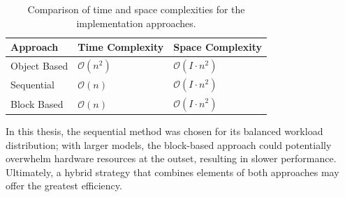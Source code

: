 \begin{table}[h!]
\centering
\caption{Comparison of time and space complexities for the implementation approaches.}
\begin{tabular}{|l|l|l|}
\hline
\textbf{Approach}    & \textbf{Time Complexity} & \textbf{Space Complexity} \\
\hline
Object Based          & $\mathcal{O}(n^2)$        & $\mathcal{O}(I \cdot n^2)$        \\
Sequential          & $\mathcal{O}(n)$        & $\mathcal{O}(I \cdot n^2)$       \\
Block Based              & $\mathcal{O}(n)$        & $\mathcal{O}(I \cdot n^2)$        \\
\hline
\end{tabular}
\label{tab:approachescomplexityComparison}
\end{table}

In this thesis, the sequential method was chosen for its balanced workload distribution; with larger models, the block-based approach could potentially overwhelm hardware resources at the outset, resulting in slower performance. Ultimately, a hybrid strategy that combines elements of both approaches may offer the greatest efficiency.